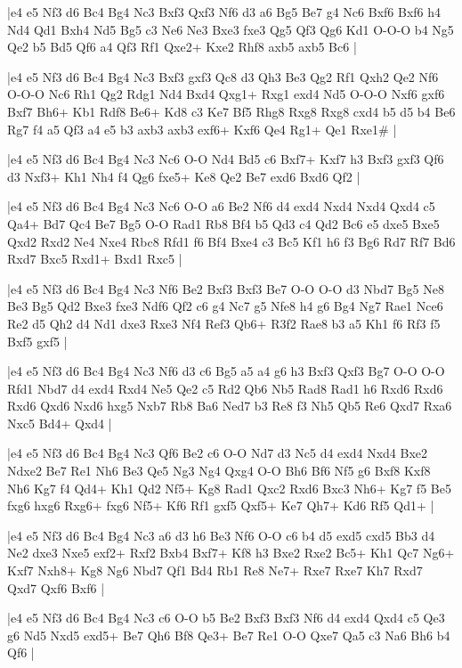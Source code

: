 \whitename{}
\blackname{}
\makegametitle
|e4 e5 Nf3 d6 Bc4 Bg4 Nc3 Bxf3 Qxf3 Nf6 d3 a6 Bg5 Be7 g4 Nc6 Bxf6 Bxf6 h4 Nd4 Qd1 Bxh4 Nd5 Bg5 c3 Ne6 Ne3 Bxe3 fxe3 Qg5 Qf3 Qg6 Kd1 O-O-O b4 Ng5 Qe2 b5 Bd5 Qf6 a4 Qf3 Rf1 Qxe2+ Kxe2 Rhf8 axb5 axb5 Bc6  |

\whitename{}
\blackname{}
\makegametitle
|e4 e5 Nf3 d6 Bc4 Bg4 Nc3 Bxf3 gxf3 Qc8 d3 Qh3 Be3 Qg2 Rf1 Qxh2 Qe2 Nf6 O-O-O Nc6 Rh1 Qg2 Rdg1 Nd4 Bxd4 Qxg1+ Rxg1 exd4 Nd5 O-O-O Nxf6 gxf6 Bxf7 Bh6+ Kb1 Rdf8 Be6+ Kd8 c3 Ke7 Bf5 Rhg8 Rxg8 Rxg8 cxd4 b5 d5 b4 Be6 Rg7 f4 a5 Qf3 a4 e5 b3 axb3 axb3 exf6+ Kxf6 Qe4 Rg1+ Qe1 Rxe1\#  |

\whitename{}
\blackname{}
\makegametitle
|e4 e5 Nf3 d6 Bc4 Bg4 Nc3 Nc6 O-O Nd4 Bd5 c6 Bxf7+ Kxf7 h3 Bxf3 gxf3 Qf6 d3 Nxf3+ Kh1 Nh4 f4 Qg6 fxe5+ Ke8 Qe2 Be7 exd6 Bxd6 Qf2  |

\whitename{}
\blackname{}
\makegametitle
|e4 e5 Nf3 d6 Bc4 Bg4 Nc3 Nc6 O-O a6 Be2 Nf6 d4 exd4 Nxd4 Nxd4 Qxd4 c5 Qa4+ Bd7 Qc4 Be7 Bg5 O-O Rad1 Rb8 Bf4 b5 Qd3 c4 Qd2 Bc6 e5 dxe5 Bxe5 Qxd2 Rxd2 Ne4 Nxe4 Rbc8 Rfd1 f6 Bf4 Bxe4 c3 Bc5 Kf1 h6 f3 Bg6 Rd7 Rf7 Bd6 Rxd7 Bxc5 Rxd1+ Bxd1 Rxc5  |

\whitename{}
\blackname{}
\makegametitle
|e4 e5 Nf3 d6 Bc4 Bg4 Nc3 Nf6 Be2 Bxf3 Bxf3 Be7 O-O O-O d3 Nbd7 Bg5 Ne8 Be3 Bg5 Qd2 Bxe3 fxe3 Ndf6 Qf2 c6 g4 Nc7 g5 Nfe8 h4 g6 Bg4 Ng7 Rae1 Nce6 Re2 d5 Qh2 d4 Nd1 dxe3 Rxe3 Nf4 Ref3 Qb6+ R3f2 Rae8 b3 a5 Kh1 f6 Rf3 f5 Bxf5 gxf5  |

\whitename{}
\blackname{}
\makegametitle
|e4 e5 Nf3 d6 Bc4 Bg4 Nc3 Nf6 d3 c6 Bg5 a5 a4 g6 h3 Bxf3 Qxf3 Bg7 O-O O-O Rfd1 Nbd7 d4 exd4 Rxd4 Ne5 Qe2 c5 Rd2 Qb6 Nb5 Rad8 Rad1 h6 Rxd6 Rxd6 Rxd6 Qxd6 Nxd6 hxg5 Nxb7 Rb8 Ba6 Ned7 b3 Re8 f3 Nh5 Qb5 Re6 Qxd7 Rxa6 Nxc5 Bd4+ Qxd4  |

\whitename{}
\blackname{}
\makegametitle
|e4 e5 Nf3 d6 Bc4 Bg4 Nc3 Qf6 Be2 c6 O-O Nd7 d3 Nc5 d4 exd4 Nxd4 Bxe2 Ndxe2 Be7 Re1 Nh6 Be3 Qe5 Ng3 Ng4 Qxg4 O-O Bh6 Bf6 Nf5 g6 Bxf8 Kxf8 Nh6 Kg7 f4 Qd4+ Kh1 Qd2 Nf5+ Kg8 Rad1 Qxc2 Rxd6 Bxc3 Nh6+ Kg7 f5 Be5 fxg6 hxg6 Rxg6+ fxg6 Nf5+ Kf6 Rf1 gxf5 Qxf5+ Ke7 Qh7+ Kd6 Rf5 Qd1+  |

\whitename{}
\blackname{}
\makegametitle
|e4 e5 Nf3 d6 Bc4 Bg4 Nc3 a6 d3 h6 Be3 Nf6 O-O c6 b4 d5 exd5 cxd5 Bb3 d4 Ne2 dxe3 Nxe5 exf2+ Rxf2 Bxb4 Bxf7+ Kf8 h3 Bxe2 Rxe2 Bc5+ Kh1 Qc7 Ng6+ Kxf7 Nxh8+ Kg8 Ng6 Nbd7 Qf1 Bd4 Rb1 Re8 Ne7+ Rxe7 Rxe7 Kh7 Rxd7 Qxd7 Qxf6 Bxf6  |

\whitename{}
\blackname{}
\makegametitle
|e4 e5 Nf3 d6 Bc4 Bg4 Nc3 c6 O-O b5 Be2 Bxf3 Bxf3 Nf6 d4 exd4 Qxd4 c5 Qe3 g6 Nd5 Nxd5 exd5+ Be7 Qh6 Bf8 Qe3+ Be7 Re1 O-O Qxe7 Qa5 c3 Na6 Bh6 b4 Qf6  |

